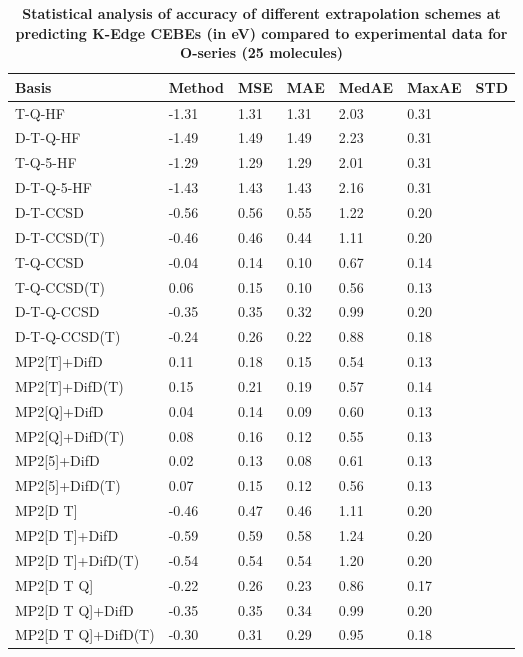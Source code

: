 \begin{table}
  \caption{\textbf{Statistical analysis of accuracy of different extrapolation schemes at predicting K-Edge CEBEs (in eV) compared to experimental data for O-series (25 molecules)}}
  \label{tbl:extrap-scheme-summary-o}
  \begin{tabular}{l l l l l l l }
    \hline
    \textbf{Basis} & \textbf{Method} & \textbf{MSE} & \textbf{MAE} & \textbf{MedAE} & \textbf{MaxAE} & \textbf{STD} \\ 
    \hline
    T-Q-HF & -1.31 & 1.31 & 1.31 & 2.03 & 0.31 \\ 
    D-T-Q-HF & -1.49 & 1.49 & 1.49 & 2.23 & 0.31 \\ 
    T-Q-5-HF & -1.29 & 1.29 & 1.29 & 2.01 & 0.31 \\ 
    D-T-Q-5-HF & -1.43 & 1.43 & 1.43 & 2.16 & 0.31 \\ 
    D-T-CCSD & -0.56 & 0.56 & 0.55 & 1.22 & 0.20 \\ 
    D-T-CCSD(T) & -0.46 & 0.46 & 0.44 & 1.11 & 0.20 \\ 
    T-Q-CCSD & -0.04 & 0.14 & 0.10 & 0.67 & 0.14 \\ 
    T-Q-CCSD(T) & 0.06 & 0.15 & 0.10 & 0.56 & 0.13 \\ 
    D-T-Q-CCSD & -0.35 & 0.35 & 0.32 & 0.99 & 0.20 \\ 
    D-T-Q-CCSD(T) & -0.24 & 0.26 & 0.22 & 0.88 & 0.18 \\ 
    MP2[T]+DifD & 0.11 & 0.18 & 0.15 & 0.54 & 0.13 \\ 
    MP2[T]+DifD(T) & 0.15 & 0.21 & 0.19 & 0.57 & 0.14 \\ 
    MP2[Q]+DifD & 0.04 & 0.14 & 0.09 & 0.60 & 0.13 \\ 
    MP2[Q]+DifD(T) & 0.08 & 0.16 & 0.12 & 0.55 & 0.13 \\ 
    MP2[5]+DifD & 0.02 & 0.13 & 0.08 & 0.61 & 0.13 \\ 
    MP2[5]+DifD(T) & 0.07 & 0.15 & 0.12 & 0.56 & 0.13 \\ 
    MP2[D T] & -0.46 & 0.47 & 0.46 & 1.11 & 0.20 \\ 
    MP2[D T]+DifD & -0.59 & 0.59 & 0.58 & 1.24 & 0.20 \\ 
    MP2[D T]+DifD(T) & -0.54 & 0.54 & 0.54 & 1.20 & 0.20 \\ 
    MP2[D T Q] & -0.22 & 0.26 & 0.23 & 0.86 & 0.17 \\ 
    MP2[D T Q]+DifD & -0.35 & 0.35 & 0.34 & 0.99 & 0.20 \\ 
    MP2[D T Q]+DifD(T) & -0.30 & 0.31 & 0.29 & 0.95 & 0.18 \\ 

\end{tabular}
\end{table}
